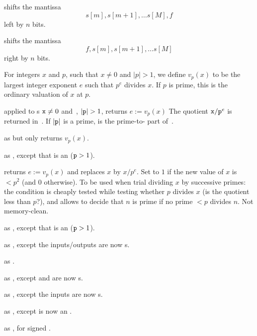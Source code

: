 shifts the mantissa
$$s[m], s[m+1],\ldots s[M], f$$
left by $n$ bits.

shifts the mantissa
$$f, s[m], s[m+1],\ldots s[M]$$
right by $n$ bits.

For integers $x$ and $p$, such that $x\neq 0$ and $|p| > 1$, we define
$v_p(x)$ to be the largest integer exponent $e$ such that $p^e$ divides $x$.
If $p$ is prime, this is the ordinary valuation of $x$ at $p$.

 applied to s
${\tt x}\neq 0$ and~, $|{\tt p}| > 1$, returns $e := v_p(x)$
The quotient ${\tt x}/{\tt p}^e$ is returned in~. If
$|{\tt p}|$ is a prime,  is the prime-to- part of~.

 as  but only returns
$v_p(x)$.

 as ,
except that  is an  (${\tt p} > 1$).

 returns $e := v_p(x)$
and replaces $x$ by $x / p^e$. Set  to $1$ if the new value
of $x$ is $ < p^2$ (and $0$ otherwise). To be used when trial dividing $x$
by successive primes: the  condition is cheaply tested while
testing whether $p$ divides $x$ (is the quotient less than $p$?), and allows
to decide that $n$ is prime if no prime $< p$ divides $n$. Not memory-clean.

 as ,
except that  is an  (${\tt p} > 1$).

 as ,
except the inputs/outputs are now s.

 as
.

 as ,
except  and  are now s.

 as ,
except the inputs are now s.

 as ,
except  is now an .

 as , for signed .

